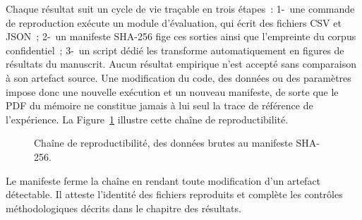Chaque résultat suit un cycle de vie traçable en trois étapes~: 1-~une commande de
reproduction exécute un module d'évaluation, qui écrit des fichiers CSV et JSON~; 2-~un
manifeste SHA-256 fige ces sorties ainsi que l'empreinte du corpus confidentiel~; 3-~un
script dédié les transforme automatiquement en figures de résultats du manuscrit. Aucun résultat empirique n'est accepté sans comparaison
à son artefact source. Une modification du code, des données ou des paramètres impose donc
une nouvelle exécution et un nouveau manifeste, de sorte que le PDF du mémoire ne constitue jamais
à lui seul la trace de référence de l'expérience. La Figure~\ref{fig:repro_chain} illustre cette chaîne de reproductibilité.

\begin{figure}[H]
  \centering
  \caption{Chaîne de reproductibilité, des données brutes au manifeste SHA-256.}
  \label{fig:repro_chain}
\end{figure}

Le manifeste ferme la chaîne en rendant toute modification d'un artefact détectable. Il
atteste l'identité des fichiers reproduits et complète les contrôles méthodologiques décrits
dans le chapitre des résultats.
